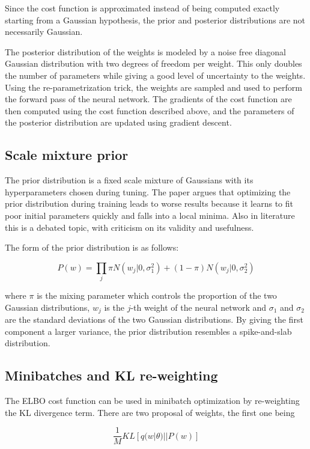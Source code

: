 \documentclass{article}
\begin{document}
Since the cost function is approximated instead of being computed exactly starting from a Gaussian hypothesis, the prior and posterior distributions are not necessarily Gaussian.

The posterior distribution of the weights is modeled by a noise free diagonal Gaussian distribution with two degrees of freedom per weight. This only doubles the number of parameters while giving a good level of uncertainty to the weights. Using the re-parametrization trick, the weights are sampled and used to perform the forward pass of the neural network. The gradients of the cost function are then computed using the cost function described above, and the parameters of the posterior distribution are updated using gradient descent.

\subsection{Scale mixture prior}

The prior distribution is a fixed scale mixture of Gaussians with its hyperparameters chosen during tuning. The paper argues that optimizing the prior distribution during training leads to worse results because it learns to fit poor initial parameters quickly and falls into a local minima. Also in literature this is a debated topic, with criticism on its validity and usefulness.

The form of the prior distribution is as follows:

\[
    P(w) = \prod_{j} \pi N(w_j | 0, \sigma_1^2) + (1 - \pi) N(w_j | 0, \sigma_2^2)
\]

where $\pi$ is the mixing parameter which controls the proportion of the two Gaussian distributions, $w_j$ is the $j$-th weight of the neural network and $\sigma_1$ and $\sigma_2$ are the standard deviations of the two Gaussian distributions. By giving the first component a larger variance, the prior distribution resembles a spike-and-slab distribution.

\subsection{Minibatches and KL re-weighting}

The ELBO cost function can be used in minibatch optimization by re-weighting the KL divergence term. There are two proposal of weights, the first one being

\[
    \frac{1}{M} KL[q(w | \theta) || P(w)]
\]
\end{document}
